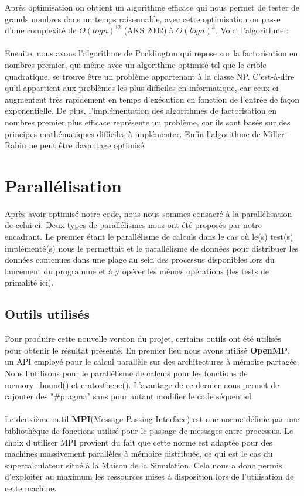 Après optimisation on obtient un algorithme efficace qui nous permet de tester de grands nombres dans un temps raisonnable, avec cette optimisation on passe d'une complexité de $O (log n)^{12}$ (AKS 2002) à $O (log n)^3$. Voici l'algorithme :

	\paragraph{}Ensuite, nous avons l'algorithme de Pocklington qui repose sur la factorisation en nombres premier, qui même avec un algorithme optimisé tel que le crible quadratique, se trouve être un problème appartenant à la classe NP. C'est-à-dire qu'il appartient aux problèmes les plus difficiles en informatique, car ceux-ci augmentent très rapidement en temps d'exécution en fonction de l'entrée de façon exponentielle. De plus, l'implémentation des algorithmes de factorisation en nombres premier plus efficace représente un problème, car ils sont basés sur des principes mathématiques difficiles à implémenter. Enfin l'algorithme de Miller-Rabin ne peut être davantage optimisé.
	

	\section{Parallélisation}
	Après avoir optimisé notre code, nous nous sommes consacré à la parallélisation de celui-ci. Deux types de parallélismes nous ont été proposés par notre encadrant. Le premier étant le parallélisme de calculs dans le cas où le(s) test(s) implémenté(s) nous le permettait et le parallélisme de données pour distribuer les données contenues dans une plage au sein des processus disponibles lors du lancement du programme et à y opérer les mêmes opérations (les tests de primalité ici).

		\subsection{Outils utilisés}
Pour produire cette nouvelle version du projet, certains outils ont été utilisés pour obtenir le résultat présenté. En premier lieu nous avons utilisé \textbf{OpenMP}\cite{omp}, un API employé pour le calcul parallèle sur des architectures à mémoire partagée. Nous l'utilisons pour le parallélisme de calculs pour les fonctions de memory\_bound() et eratosthene(). L'avantage de ce dernier nous permet de rajouter des "\#pragma" sans pour autant modifier le code séquentiel.

		\paragraph{}Le deuxième outil \textbf{MPI}(Message Passing Interface)\cite{MPI} est une norme définie par une bibliothèque de fonctions utilisé pour le passage de messages entre processus. Le choix d'utiliser MPI provient du fait que cette norme est adaptée pour des machines massivement parallèles à mémoire distribuée, ce qui est le cas du supercalculateur situé à la Maison de la Simulation. Cela nous a donc permis d'exploiter au maximum les ressources mises à disposition lors de l'utilisation de cette machine. 
		

